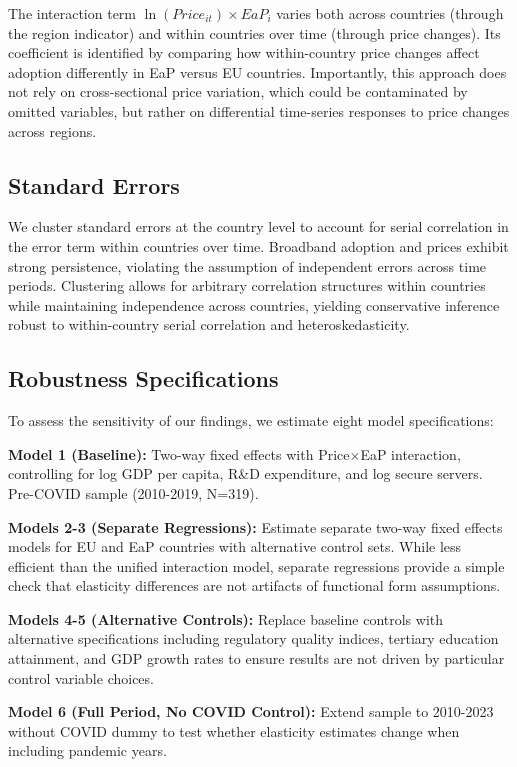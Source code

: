 \documentclass[12pt,review]{elsarticle}
\begin{document}
The interaction term $\ln(Price_{it}) \times EaP_i$ varies both across countries (through the region indicator) and within countries over time (through price changes). Its coefficient is identified by comparing how within-country price changes affect adoption differently in EaP versus EU countries. Importantly, this approach does not rely on cross-sectional price variation, which could be contaminated by omitted variables, but rather on differential time-series responses to price changes across regions.

\subsection{Standard Errors}

We cluster standard errors at the country level to account for serial correlation in the error term within countries over time. Broadband adoption and prices exhibit strong persistence, violating the assumption of independent errors across time periods. Clustering allows for arbitrary correlation structures within countries while maintaining independence across countries, yielding conservative inference robust to within-country serial correlation and heteroskedasticity.

\subsection{Robustness Specifications}

To assess the sensitivity of our findings, we estimate eight model specifications:

\textbf{Model 1 (Baseline):} Two-way fixed effects with Price$\times$EaP interaction, controlling for log GDP per capita, R\&D expenditure, and log secure servers. Pre-COVID sample (2010-2019, N=319).

\textbf{Models 2-3 (Separate Regressions):} Estimate separate two-way fixed effects models for EU and EaP countries with alternative control sets. While less efficient than the unified interaction model, separate regressions provide a simple check that elasticity differences are not artifacts of functional form assumptions.

\textbf{Models 4-5 (Alternative Controls):} Replace baseline controls with alternative specifications including regulatory quality indices, tertiary education attainment, and GDP growth rates to ensure results are not driven by particular control variable choices.

\textbf{Model 6 (Full Period, No COVID Control):} Extend sample to 2010-2023 without COVID dummy to test whether elasticity estimates change when including pandemic years.
\end{document}
